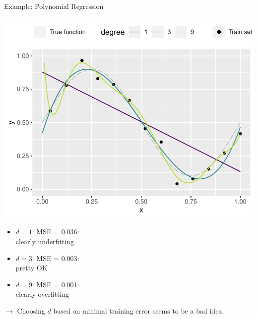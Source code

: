 \documentclass[11pt,compress,t,notes=noshow, xcolor=table]{beamer}
\begin{document}
\begin{vbframe}{Example: Polynomial Regression}
\begin{minipage}[c]{0.6\textwidth}
  \includegraphics[width=\textwidth]{figure/eval_train_2} 
\end{minipage}%
\begin{minipage}[c]{0.4\textwidth}
  \begin{itemize}
    \footnotesize
    \item $d = 1$: MSE = 0.036: \\clearly underfitting
    \item $d = 3$: MSE = 0.003: \\pretty OK
    \item $d = 9$: MSE = 0.001: \\clearly overfitting
  \end{itemize}
\end{minipage}

\vfill

$\rightarrow$ Choosing $d$ based on minimal training error seems to be a bad 
idea.

\end{vbframe}

\end{document}
